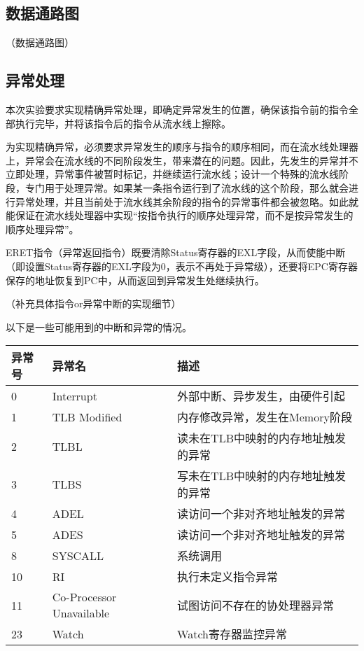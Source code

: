 \subsection{数据通路图}
（数据通路图）
\subsection{异常处理}
本次实验要求实现精确异常处理，即确定异常发生的位置，确保该指令前的指令全部执行完毕，并将该指令后的指令从流水线上擦除。

为实现精确异常，必须要求异常发生的顺序与指令的顺序相同，而在流水线处理器上，异常会在流水线的不同阶段发生，带来潜在的问题。因此，先发生的异常并不立即处理，异常事件被暂时标记，并继续运行流水线；设计一个特殊的流水线阶段，专门用于处理异常。如果某一条指令运行到了流水线的这个阶段，那么就会进行异常处理，并且当前处于流水线其余阶段的指令的异常事件都会被忽略。如此就能保证在流水线处理器中实现“按指令执行的顺序处理异常，而不是按异常发生的顺序处理异常”。

ERET指令（异常返回指令）既要清除Status寄存器的EXL字段，从而使能中断（即设置Status寄存器的EXL字段为0，表示不再处于异常级），还要将EPC寄存器保存的地址恢复到PC中，从而返回到异常发生处继续执行。

（补充具体指令or异常中断的实现细节）

以下是一些可能用到的中断和异常的情况。

\begin{table}[H]
	\centering
	\begin{tabular}{lll}
		\hline
		异常号&异常名&描述\\
		\hline
		0&Interrupt&外部中断、异步发生，由硬件引起\\
		1&TLB Modified&内存修改异常，发生在Memory阶段\\
		2&TLBL&读未在TLB中映射的内存地址触发的异常\\
		3&TLBS&写未在TLB中映射的内存地址触发的异常\\
		4&ADEL&读访问一个非对齐地址触发的异常\\
		5&ADES&读访问一个非对齐地址触发的异常\\
		8&SYSCALL&系统调用\\
		10&RI&执行未定义指令异常\\
		11&Co-Processor Unavailable&试图访问不存在的协处理器异常\\
		23&Watch&Watch寄存器监控异常\\
		\hline
	\end{tabular}
\end{table}

